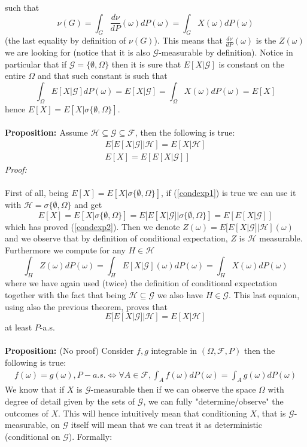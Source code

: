 \documentclass[a4paper,10pt]{report}
\theoremstyle{plain}
\theoremstyle{definition}
\newcommand\be{\begin{eqnarray}}    %
\newcommand\ee{\end{eqnarray}}
\newcommand{\PROP} {{\bf{Proposition: }}}
\newcommand{\PROOF} {{\emph{Proof: \\ \\}}}
\newcommand{\FF} {\mathcal{F} }
\begin{document}
such that
\[
\nu(G)=\int_G \frac{d\nu}{dP}(\omega) dP(\omega)=\int_G X(\omega) dP(\omega)
\]
(the last equality by definition of $\nu(G)$). This means that $\frac{d\nu}{dP}(\omega)$ is the $Z(\omega)$ we are looking for (notice that it is also $\mathcal{G}$-measurable  by definition).
Notice in particular that if $\mathcal{G}=\{\emptyset, \Omega\}$ then it is sure that $E[X|\mathcal{G}]$ is constant on the entire $\Omega$ and that such constant is such that
\[
\int_\Omega E[X|\mathcal{G}] dP(\omega)=E[X|\mathcal{G}]=\int_\Omega X(\omega) dP(\omega)=E[X]
\]
hence $E[X]=E[X|\sigma\{\emptyset, \Omega\}]$.\\ \\
\PROP Assume $\mathcal{H}\subseteq \mathcal{G}\subseteq \FF$, then the following is true:
\be
\label{condexp1}
E[E[X|\mathcal{G}]|\mathcal{H}]=E[X|\mathcal{H}]\\
\label{condexp2}
E[X]=E[E[X|\mathcal{G}]]
\ee
\PROOF
First of all, being $E[X]=E[X|\sigma\{\emptyset, \Omega\}]$,  if (\ref{condexp1}) is true we can use it with $\mathcal{H}=\sigma\{\emptyset, \Omega\}$ and get
\[
E[X]=E[X|\sigma\{\emptyset, \Omega\}]=E[E[X|\mathcal{G}]|\sigma\{\emptyset, \Omega\}]=E[E[X|\mathcal{G}]]
\]
which has proved (\ref{condexp2}).
Then we denote $Z(\omega)=E[E[X|\mathcal{G}]|\mathcal{H}](\omega)$ and we observe that by definition of conditional expectation, $Z$ is $\mathcal{H}$ measurable. Furthermore we compute for any $H\in \mathcal{H}$
\[
\int_H Z(\omega) dP(\omega)=\int_H E[X|\mathcal{G}](\omega) dP(\omega)=\int_H X(\omega) dP(\omega)
\]
where we have again used (twice) the definition of conditional expectation together with the fact that being $\mathcal{H}\subseteq \mathcal{G}$ we also have $H\in \mathcal{G}$.
This last equaion, using also the previous theorem, proves that 
\[
E[E[X|\mathcal{G}]|\mathcal{H}]=E[X|\mathcal{H}]
\]
at least $P$-a.s.\\ \\
\PROP (No proof) Consider $f,g$ integrable in $(\Omega,\FF,P)$ then the following is true:
\be
\label{fgeqvsint}
f(\omega)=g(\omega), P-a.s. \Leftrightarrow \forall A\in \FF, \int_A f(\omega)dP(\omega)=\int_A g(\omega)dP(\omega)
\ee
We know that if $X$ is $\mathcal{G}$-measurable then if we can observe the space $\Omega$ with degree of detail given by the sets of $\mathcal{G}$, we can fully "determine/observe" the outcomes of $X$. This will hence intuitively mean that conditioning $X$, that is $\mathcal{G}$-measurable, on $\mathcal{G}$ itself will mean that we can treat it as deterministic (conditional on $\mathcal{G}$). Formally: \\ \\
\end{document}
